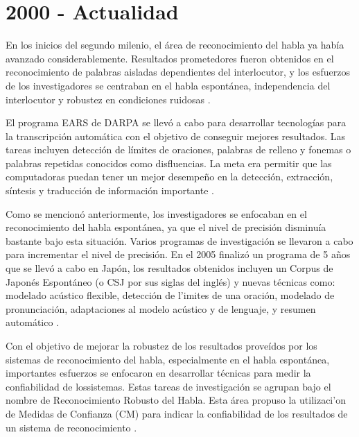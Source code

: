 \section{2000 - Actualidad}
\label{sec:post2000s}


En los inicios del segundo milenio, el \'{a}rea de reconocimiento del habla ya hab\'{i}a avanzado 
considerablemente. Resultados prometedores fueron obtenidos en el reconocimiento de palabras aisladas
dependientes del interlocutor, y los esfuerzos de los investigadores se centraban en el habla espont\'{a}nea,
independencia del interlocutor y robustez en condiciones ruidosas \cite{RonzhinSurvey2006}.

El programa EARS de DARPA se llev\'{o} a cabo para desarrollar tecnolog\'{i}as para la transcripci\'{o}n 
autom\'{a}tica con el objetivo de conseguir mejores resultados. 
Las tareas incluyen detecci\'{o}n de l\'{i}mites de oraciones, palabras de relleno 
y fonemas o palabras repetidas conocidos como disfluencias. 
La meta era permitir que las computadoras puedan tener un mejor desempe\~{n}o en la detecci\'{o}n, extracci\'{o}n, 
s\'{i}ntesis y traducci\'{o}n de informaci\'{o}n importante \cite{LiuStructural2005, SoltauTheIBM2005}.

Como se mencion\'{o} anteriormente, los investigadores se enfocaban en el reconocimiento del habla espont\'{a}nea, 
ya que el nivel de precisi\'{o}n disminu\'{i}a bastante bajo esta situaci\'{o}n. Varios programas de 
investigaci\'{o}n se llevaron a cabo para incrementar el nivel de precisi\'{o}n. En el 2005 finaliz\'{o} un 
programa de 5 a\~{n}os que se llev\'{o} a cabo en Jap\'{o}n, los resultados obtenidos incluyen un 
Corpus de Japon\'{e}s Espont\'{a}neo (o CSJ por sus siglas del ingl\'{e}s) y nuevas t\'{e}cnicas como: 
modelado ac\'{u}stico flexible, detecci\'{o}n de l'{i}mites de una oraci\'on, modelado de pronunciaci\'{o}n,
adaptaciones al modelo ac\'{u}stico y de lenguaje, y
resumen autom\'{a}tico \cite{FuruiRecent2005}.

Con el objetivo de mejorar la robustez de los resultados prove\'{i}dos por los sistemas de reconocimiento del habla, 
especialmente en el habla espont\'{a}nea, importantes esfuerzos se enfocaron en desarrollar t\'{e}cnicas para medir 
la confiabilidad de lossistemas. Estas tareas de investigaci\'{o}n se agrupan bajo el nombre de 
Reconocimiento Robusto del Habla. Esta \'{a}rea propuso la utilizaci'{o}n de Medidas de Confianza (CM) para indicar 
la confiabilidad de los resultados de un sistema de reconocimiento \cite{JiangConfidence2005}.

